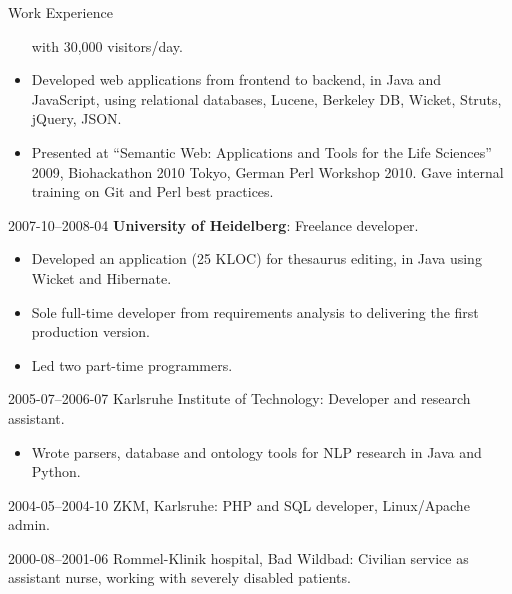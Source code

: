 \begin{cv}{}
\begin{cvlist}{Work Experience}
\begin{itemize}
      with 30,000 visitors/day.
    \item Developed web applications from frontend to backend, in Java
      and JavaScript, using relational databases, Lucene, Berkeley DB,
      Wicket, Struts, jQuery, JSON.
    \item Presented at ``Semantic Web: Applications and Tools for the
      Life Sciences'' 2009, Biohackathon 2010 Tokyo, German Perl
      Workshop 2010. Gave internal training on Git and Perl best
      practices.
    \end{itemize}
  \item[2007-10--2008-04] \textbf{University of Heidelberg}: Freelance
    developer.
    \begin{itemize}
    \item Developed an application (25 KLOC) for thesaurus editing,
      in Java using Wicket and Hibernate.
    \item Sole full-time developer from requirements analysis to
      delivering the first production version.
    \item Led two part-time programmers.
    \end{itemize}
  \item[2005-07--2006-07] Karlsruhe Institute of Technology: Developer and
    research assistant.
    \begin{itemize}
    \item Wrote parsers, database and ontology tools for NLP research
      in Java and Python.
    \end{itemize}
  \item[2004-05--2004-10] ZKM, Karlsruhe: PHP and SQL developer,
    Linux/Apache admin.
  \item[2000-08--2001-06] Rommel-Klinik hospital, Bad Wildbad:
    Civilian service as assistant nurse, working with severely
    disabled patients.
  \end{cvlist}


\end{cv}
